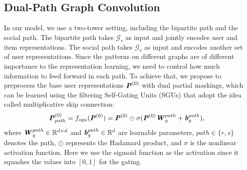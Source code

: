 \documentclass[letterpaper]{article} %
\begin{document}
\subsection{Dual-Path Graph Convolution}
In our model, we use a two-tower setting, including the bipartite path and the social path. The bipartite path takes $\mathcal{G}_r$ as input and jointly encodes user and item representations. The social path takes $\mathcal{G}_s$ as input and encodes another set of user representations. Since the patterns on different graphs are of different importance to the representation learning, we need to control how much information to feed forward in each path. To achieve that, we propose to preprocess the base user representations $\textbf{\textit{P}}^{(0)}$ with dual partial maskings, which can be learned using the filtering Self-Gating Units (SGUs) \cite{SGU} that adopt the idea called multiplicative skip connection:
\begin{equation}
    \textbf{\textit{P}}^{(0)}_{path} = f_{sgu}(\textbf{\textit{P}}^{(0)}) = \textbf{\textit{P}}^{(0)} \odot \sigma (\textbf{\textit{P}}^{(0)}\textbf{\textit{W}}^{path}_{g} + \textbf{\textit{b}}^{path}_{g}),
\end{equation}
where $\textbf{\textit{W}}^{path}_{g} \in \mathbb{R}^{d\times d}$ and $\textbf{\textit{b}}^{path}_{g} \in \mathbb{R}^{d}$ are learnable parameters, $path \in \{r,s\}$ denotes the path, $\odot$ represents the Hadamard product, and $\sigma$ is the nonlinear activation function. Here we use the sigmoid function as the activation since it squashes the values into $[0,1]$ for the gating.
\end{document}
